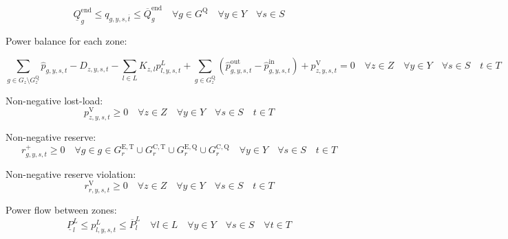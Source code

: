 \documentclass{article}
\newcommand{\sGenerators}{G}
\newcommand{\sGeneratorsExistingThermal}{G^{\mathrm{E,T}}}
\newcommand{\sGeneratorsCandidateThermal}{G^{\mathrm{C,T}}}
\newcommand{\sStorage}{G^{\mathrm{Q}}}
\newcommand{\sStorageExisting}{G^{\mathrm{E,Q}}}
\newcommand{\sStorageCandidate}{G^{\mathrm{C,Q}}}
\newcommand{\sYears}{Y}
\newcommand{\sScenarios}{S}
\newcommand{\sIntervals}{T}
\newcommand{\sZones}{Z}
\newcommand{\sLinks}{L}
\newcommand{\iGenerator}{g}
\newcommand{\iYear}{y}
\newcommand{\iScenario}{s}
\newcommand{\iInterval}{t}
\newcommand{\iIntervalTerminal}{\overline{\iInterval}}
\newcommand{\iZone}{z}
\newcommand{\iRegion}{r}
\newcommand{\iLink}{l}
\newcommand{\cStorageUnitEnergyIntervalEndMax}[1][\iGenerator]{\overline{Q}^{\mathrm{end}}_{#1}}
\newcommand{\cStorageUnitEnergyIntervalEndMin}[1][\iGenerator]{\underline{Q}^{\mathrm{end}}_{#1}}
\newcommand{\cDemand}[1][\iZone,\iYear,\iScenario,\iInterval]{D_{#1}}
\newcommand{\cIncidenceMatrix}[1][\iZone,\iLink]{K_{#1}}
\newcommand{\cPowerFlowMin}{\underline{P}_{\iLink}^{L}}
\newcommand{\cPowerFlowMax}{\overline{P}_{\iLink}^{L}}
\newcommand{\vReserveUp}[1][\iGenerator,\iYear,\iScenario,\iInterval]{r^{+}_{#1}}
\newcommand{\vReserveUpViolation}[1][\iRegion,\iYear,\iScenario,\iInterval]{r^{\mathrm{V}}_{#1}}
\newcommand{\vPowerTotal}[1][\iGenerator,\iYear,\iScenario,\iInterval]{\hat{p}_{#1}}
\newcommand{\vPowerTotalIn}[1][\iGenerator,\iYear,\iScenario,\iInterval]{\hat{p}^{\mathrm{in}}_{#1}}
\newcommand{\vPowerTotalOut}[1][\iGenerator,\iYear,\iScenario,\iInterval]{\hat{p}^{\mathrm{out}}_{#1}}
\newcommand{\vStorageUnitEnergy}[1][\iGenerator,\iYear,\iScenario,\iInterval]{q_{#1}}
\newcommand{\vPowerFlow}[1][\iLink,\iYear,\iScenario,\iInterval]{p^{\sLinks}_{#1}}
\newcommand{\vLostLoadPower}[1][\iZone,\iYear,\iScenario,\iInterval]{p^{\mathrm{V}}_{#1}}
\begin{document}
\begin{equation}
\cStorageUnitEnergyIntervalEndMin \leq \vStorageUnitEnergy[\iGenerator,\iYear,\iScenario,\iIntervalTerminal] \leq \cStorageUnitEnergyIntervalEndMax \quad \forall \iGenerator \in \sStorage \quad \forall \iYear \in \sYears \quad \forall \iScenario \in \sScenarios
\end{equation}

Power balance for each zone:

\begin{equation}
\sum\limits_{\iGenerator \in \sGenerators_{\iZone} \setminus \sStorage_{\iZone}} \vPowerTotal - \cDemand - \sum\limits_{\iLink \in \sLinks} \cIncidenceMatrix \vPowerFlow + \sum\limits_{\iGenerator \in \sStorage_{\iZone}} \left(\vPowerTotalOut - \vPowerTotalIn\right) + \vLostLoadPower = 0 \quad \forall \iZone \in \sZones \quad \forall \iYear \in \sYears \quad \forall \iScenario \in \sScenarios \quad \iInterval \in \sIntervals
\end{equation}

Non-negative lost-load:
\begin{equation}
\vLostLoadPower \geq 0 \quad \forall \iZone \in \sZones \quad \forall \iYear \in \sYears \quad \forall \iScenario \in \sScenarios \quad \iInterval \in \sIntervals
\end{equation}

Non-negative reserve:
\begin{equation}
\vReserveUp \geq 0 \quad \forall \iGenerator \in \iGenerator \in \sGeneratorsExistingThermal_{\iRegion} \cup \sGeneratorsCandidateThermal_{\iRegion} \cup \sStorageExisting_{\iRegion} \cup \sStorageCandidate_{\iRegion} \quad \forall \iYear \in \sYears \quad \forall \iScenario \in \sScenarios \quad \iInterval \in \sIntervals
\end{equation}

Non-negative reserve violation:
\begin{equation}
\vReserveUpViolation \geq 0 \quad \forall \iZone \in \sZones \quad \forall \iYear \in \sYears \quad \forall \iScenario \in \sScenarios \quad \iInterval \in \sIntervals
\end{equation}

Power flow between zones:
\begin{equation}
\cPowerFlowMin \leq \vPowerFlow \leq \cPowerFlowMax \quad \forall \iLink \in \sLinks \quad \forall \iYear \in \sYears \quad \forall \iScenario \in \sScenarios \quad \forall \iInterval \in \sIntervals
\label{eqn: powerflow constraints}
\end{equation}
\end{document}
